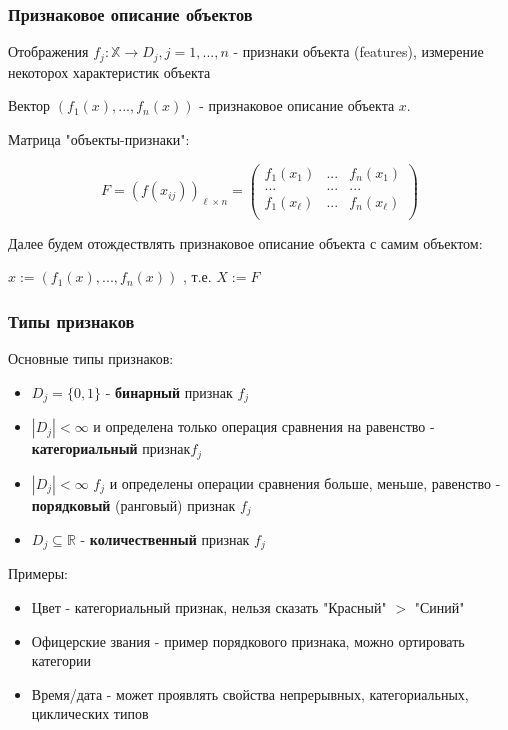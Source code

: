 \documentclass{beamer}
\begin{document}
	\begin{frame}
		\frametitle{Признаковое описание объектов}
		
		Отображения $f_j: \mathbb{X} \to D_j, j=1, ..., n$ - признаки объекта (features), измерение некоторох характеристик объекта
		
		
	
		Вектор $(f_1(x), ..., f_n(x))$ - признаковое описание объекта $x$.
		
		\vspace{5pt}
		
		Матрица "объекты-признаки":
		
		 $$
		 F = (f(x_{ij}))_{\ell \times n} = 
		 \begin{pmatrix}
		 	f_{1}(x_1) & ... & f_{n}(x_1) \\
		 	... & ... & ... \\
		 	f_{1}(x_{\ell}) & ... & f_{n}(x_{\ell}) \\		 	
		 \end{pmatrix}
		 $$
		 
		 Далее будем отождествлять признаковое описание объекта с самим объектом:
		 
		 $x := (f_1(x), ..., f_n(x))$
		 , т.е. $X := F$
	\end{frame}
		
	
	\begin{frame}
		\frametitle{Типы признаков}
		Основные типы признаков:
		\begin{itemize}
			\item $D_j = \{0, 1\}$ - \textbf{бинарный} признак $f_j$
			\item $|D_j| < \infty$ и определена только операция сравнения на равенство - \textbf{категориальный} признак$f_j$
			\item $|D_j| < \infty$ $f_j$ и определены операции сравнения больше, меньше, равенство - \textbf{порядковый }(ранговый) признак $f_j$
			\item $D_j \subseteq \mathbb{R}$ - \textbf{количественный} признак $f_j$
		\end{itemize}
	
		\vspace{5pt}
		
		Примеры:
		\begin{itemize}
			\item Цвет - категориальный признак, нельзя сказать "Красный" $>$ "Синий"
			\item Офицерские звания - пример порядкового признака, можно ортировать категории
			\item Время/дата - может проявлять свойства непрерывных, категориальных, циклических типов
		\end{itemize}
	\end{frame}
	
\end{document}
